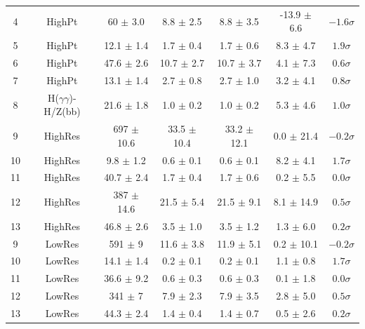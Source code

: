 \begin{table}[h]
\begin{center}
\begin{tabular}{|cc|cccc|c|}
4          & HighPt   &  60 $\pm$ 3.0     & 8.8 $\pm$ 2.5    & 8.8 $\pm$ 3.5    & -13.9 $\pm$ 6.6    & $-1.6 \sigma$    \\
5          & HighPt   &  12.1 $\pm$ 1.4   & 1.7 $\pm$ 0.4    & 1.7 $\pm$ 0.6    & 8.3 $\pm$ 4.7      & $1.9 \sigma$     \\
6          & HighPt   &  47.6 $\pm$ 2.6   & 10.7 $\pm$ 2.7   & 10.7 $\pm$ 3.7   & 4.1 $\pm$ 7.3      & $0.6 \sigma$     \\
7          & HighPt   &  13.1 $\pm$ 1.4   & 2.7 $\pm$ 0.8    & 2.7 $\pm$ 1.0    & 3.2 $\pm$ 4.1      & $0.8 \sigma$     \\
\hline
8          & H($\gamma\gamma$)-H/Z(bb)     &  21.6 $\pm$ 1.8   & 1.0 $\pm$ 0.2    & 1.0 $\pm$ 0.2    & 5.3 $\pm$ 4.6      & $1.0 \sigma$    \\
\hline
9          & HighRes  &  697 $\pm$ 10.6   & 33.5 $\pm$ 10.4  & 33.2 $\pm$ 12.1  & 0.0 $\pm$ 21.4     &  $-0.2 \sigma$   \\ %
10         & HighRes  &  9.8 $\pm$ 1.2    & 0.6 $\pm$ 0.1    & 0.6 $\pm$ 0.1    & 8.2 $\pm$ 4.1      &  $1.7 \sigma$    \\ 
11         & HighRes  &  40.7 $\pm$ 2.4   & 1.7 $\pm$ 0.4    & 1.7 $\pm$ 0.6    & 0.2 $\pm$ 5.5      &  $0.0 \sigma$    \\ 
12         & HighRes  &  387 $\pm$ 14.6   & 21.5 $\pm$ 5.4   & 21.5 $\pm$ 9.1   & 8.1 $\pm$ 14.9     &  $0.5 \sigma$    \\ 
13         & HighRes  &  46.8 $\pm$ 2.6   & 3.5 $\pm$ 1.0    & 3.5 $\pm$ 1.2    & 1.3 $\pm$ 6.0      &  $0.2 \sigma$    \\ 
\hline                                                                          
9          & LowRes   &  591 $\pm$ 9      & 11.6 $\pm$ 3.8   & 11.9 $\pm$ 5.1   & 0.2 $\pm$ 10.1     & $-0.2 \sigma$    \\
10         & LowRes   &  14.1 $\pm$ 1.4   & 0.2 $\pm$ 0.1    & 0.2 $\pm$ 0.1    & 1.1 $\pm$ 0.8      & $1.7 \sigma$     \\
11         & LowRes   &  36.6 $\pm$ 9.2   & 0.6 $\pm$ 0.3    & 0.6 $\pm$ 0.3    & 0.1 $\pm$ 1.8      & $0.0 \sigma$     \\
12         & LowRes   &  341  $\pm$ 7     & 7.9 $\pm$ 2.3    & 7.9 $\pm$ 3.5    & 2.8 $\pm$ 5.0      & $0.5 \sigma$     \\
13         & LowRes   &  44.3 $\pm$ 2.4   & 1.4 $\pm$ 0.4    & 1.4 $\pm$ 0.7    & 0.5 $\pm$ 2.6      & $0.2 \sigma$     \\
\hline
\end{tabular}
\label{tab:bkgYieldTable}
\end{center}
\end{table}




